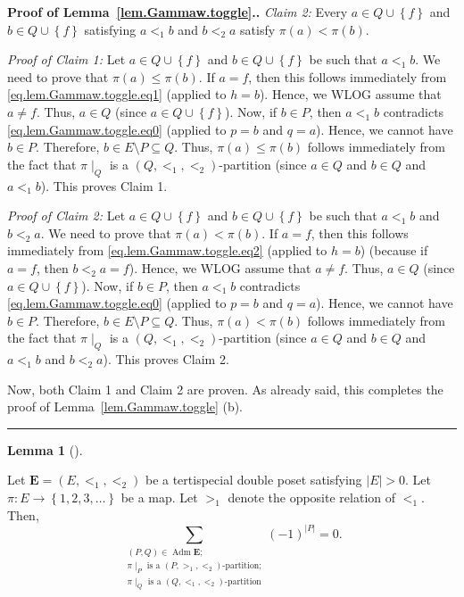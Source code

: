 \documentclass[numbers=enddot,12pt,final,onecolumn,notitlepage,abstracton]{scrartcl}
\theoremstyle{definition}
\newtheorem{lem}[theo]{Lemma}
\newenvironment{lemma}[1][]
{\begin{lem}[#1]\begin{leftbar}}
{\end{leftbar}\end{lem}}
\newenvironment{proof}[1][Proof]{\noindent\textbf{#1.} }{\ \rule{0.5em}{0.5em}}
\let\sumnonlimits\sum
\renewcommand{\sum}{\sumnonlimits\limits}
\newcommand{\Adm}{\operatorname{Adm}}
\newcommand{\EE}{{\mathbf{E}}}
\begin{document}
\begin{proof}[Proof of Lemma~\ref{lem.Gammaw.toggle}.]
\textit{Claim 2:} Every $a\in Q\cup\left\{  f\right\}  $ and $b\in
Q\cup\left\{  f\right\}  $ satisfying $a<_{1}b$ and $b<_{2}a$ satisfy
$\pi\left(  a\right)  <\pi\left(  b\right)  $.

\textit{Proof of Claim 1:} Let $a\in Q\cup\left\{  f\right\}  $ and $b\in
Q\cup\left\{  f\right\}  $ be such that $a<_{1}b$. We need to prove that
$\pi\left(  a\right)  \leq\pi\left(  b\right)  $. If $a=f$, then this follows
immediately from \eqref{eq.lem.Gammaw.toggle.eq1} (applied to $h=b$).
Hence, we WLOG assume that $a\neq f$. Thus, $a\in Q$ (since $a\in
Q\cup\left\{  f\right\}  $). Now, if $b\in P$, then $a<_{1}b$ contradicts
\eqref{eq.lem.Gammaw.toggle.eq0} (applied to $p=b$ and $q=a$). Hence,
we cannot have $b\in P$. Therefore, $b\in E\setminus P
\subseteq Q$. Thus, $\pi\left(  a\right)  \leq\pi\left(
b\right)  $ follows immediately from the fact that $\pi\mid_{Q}$ is a $\left(
Q,<_{1},<_{2}\right)  $-partition (since $a \in Q$ and $b \in Q$ and
$a <_1 b$).
This proves Claim 1.

\textit{Proof of Claim 2:} Let $a\in Q\cup\left\{  f\right\}  $ and $b\in
Q\cup\left\{  f\right\}  $ be such that $a<_{1}b$ and $b<_{2}a$. We need to
prove that $\pi\left(  a\right)  <\pi\left(  b\right)  $. If $a=f$, then this
follows immediately from \eqref{eq.lem.Gammaw.toggle.eq2} (applied
to $h=b$) (because if $a = f$, then $b <_2 a = f$).
Hence, we WLOG assume that $a\neq f$. Thus, $a\in Q$ (since $a\in
Q\cup\left\{  f\right\}  $). Now, if $b\in P$, then $a<_{1}b$ contradicts
\eqref{eq.lem.Gammaw.toggle.eq0} (applied to $p=b$ and $q=a$). Hence,
we cannot have $b\in P$. Therefore, $b\in E\setminus P \subseteq Q$.
Thus, $\pi\left(  a\right)  <\pi\left(
b\right)  $ follows immediately from the fact that $\pi\mid_{Q}$ is a $\left(
Q,<_{1},<_{2}\right)  $-partition (since $a \in Q$ and $b \in Q$ and
$a <_1 b$ and $b <_2 a$).
This proves Claim 2.

Now, both Claim 1 and Claim 2 are proven. As already said, this
completes the proof of Lemma~\ref{lem.Gammaw.toggle} (b).
\end{proof}

\begin{lemma}
\label{lem.Gammaw.altsum}
Let $\EE = \left(E, <_1, <_2\right)$ be a tertispecial double
poset satisfying $\left|E\right| > 0$.
Let $\pi : E \to \left\{ 1, 2, 3, \ldots \right\}$ be a map.
Let $>_1$ denote the opposite relation of $<_1$. Then,
\begin{equation}
\sum_{\substack{\left(P, Q\right) \in \Adm \EE ; \\
                \pi\mid_P \text{ is a }\left(P, >_1, <_2\right)\text{-partition;} \\
                \pi\mid_Q \text{ is a }\left(Q, <_1, <_2\right)\text{-partition}}}
\left(-1\right)^{\left|P\right|}
= 0 .
\label{pf.thm.antipode.Gammaw.signrev}
\end{equation}
\end{lemma}
\end{document}
